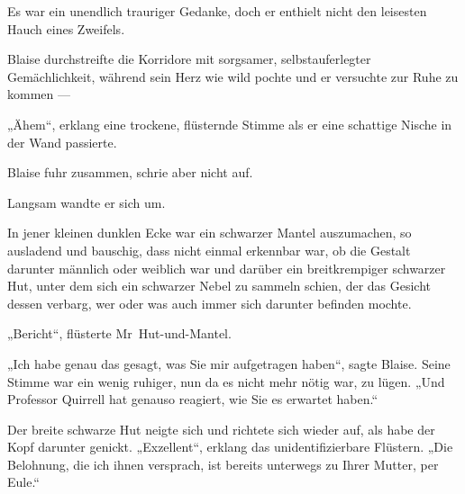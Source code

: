 Es war ein unendlich trauriger Gedanke, doch er enthielt nicht den leisesten Hauch eines Zweifels.


Blaise durchstreifte die Korridore mit sorgsamer, selbstauferlegter Gemächlichkeit, während sein Herz wie wild pochte und er versuchte zur Ruhe zu kommen —

„Ähem“, erklang eine trockene, flüsternde Stimme als er eine schattige Nische in der Wand passierte.

Blaise fuhr zusammen, schrie aber nicht auf.

Langsam wandte er sich um.

In jener kleinen dunklen Ecke war ein schwarzer Mantel auszumachen, so ausladend und bauschig, dass nicht einmal erkennbar war, ob die Gestalt darunter männlich oder weiblich war und darüber ein breitkrempiger schwarzer Hut, unter dem sich ein schwarzer Nebel zu sammeln schien, der das Gesicht dessen verbarg, wer oder was auch immer sich darunter befinden mochte.

„Bericht“, flüsterte Mr~Hut-und-Mantel.

„Ich habe genau das gesagt, was Sie mir aufgetragen haben“, sagte Blaise. Seine Stimme war ein wenig ruhiger, nun da es nicht mehr nötig war, zu lügen.
„Und Professor Quirrell hat genauso reagiert, wie Sie es erwartet haben.“

Der breite schwarze Hut neigte sich und richtete sich wieder auf, als habe der Kopf darunter genickt.
„Exzellent“, erklang das unidentifizierbare Flüstern.
„Die Belohnung, die ich ihnen versprach, ist bereits unterwegs zu Ihrer Mutter, per Eule.“

